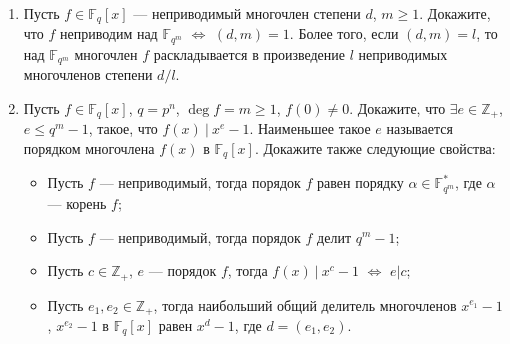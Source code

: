 \documentclass[a4paper, 11pt]{article}
\begin{document}
\begin{enumerate}[topsep=0pt]
    \item Пусть $f\in\mathbb{F}_q[x]$ --- неприводимый многочлен степени $d$, $m\geqslant 1$. Докажите, что $f$ неприводим над $\mathbb{F}_{q^m}$ $\Leftrightarrow$ $(d,m)=1$. Более того, если $(d,m)=l$, то над $\mathbb{F}_{q^m}$ многочлен $f$ раскладывается в произведение $l$ неприводимых многочленов степени $d/l$. %

    \item Пусть $f\in \mathbb{F}_q[x]$, $q=p^n$, $\deg f = m \geqslant 1$, $f(0) \neq 0$. Докажите, что $\exists e \in \mathbb{Z}_+$, $e\leqslant q^m-1$, такое, что $f(x)\ |\ x^e-1$. Наименьшее такое $e$ называется порядком многочлена $f(x)$ в $\mathbb{F}_q[x]$. Докажите также следующие свойства:
    \begin{itemize}[noitemsep,topsep=0pt]
        \item Пусть $f$ --- неприводимый, тогда порядок $f$ равен порядку $\alpha \in \mathbb{F}_{q^m}^*$, где $\alpha$ --- корень $f$;
        \item Пусть $f$ --- неприводимый, тогда порядок $f$ делит $q^m-1$;
        \item Пусть $c\in \mathbb{Z}_+$, $e$ --- порядок $f$, тогда $f(x)\ |\ x^c-1$ $\Leftrightarrow$ $e|c$;
        \item Пусть $e_1, e_2\in \mathbb{Z}_+$, тогда наибольший общий делитель многочленов $x^{e_1}-1$, $x^{e_2}-1$ в $\mathbb{F}_q[x]$ равен $x^d-1$, где $d=(e_1,e_2)$.
    \end{itemize} %

\end{enumerate}

        
\end{document}

